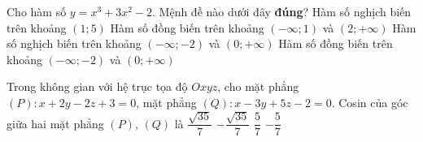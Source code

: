 \begin{ex}%
Cho hàm số $y=x^3+3x^2-2$. Mệnh đề nào dưới đây \textbf{đúng}?
\choice
{Hàm số nghịch biến trên khoảng $(1;5)$}
{Hàm số đồng biến trên khoảng $(-\infty;1)$ và $(2;+\infty)$}
{Hàm số nghịch biến trên khoảng $(-\infty;-2)$ và $(0;+\infty)$}
{\True Hàm số đồng biến trên khoảng $(-\infty;-2)$ và $(0;+\infty)$}
\end{ex}
\begin{ex}%
	Trong không gian với hệ trục tọa độ $Oxyz$, cho mặt phẳng $(P):x+2y-2z+3=0$, mặt phẳng $(Q):x-3y+5z-2=0$. Cosin của góc giữa hai mặt phẳng $(P)$, $(Q)$ là
	\choice
	{\True $\dfrac{\sqrt{35}}{7}$}
	{$-\dfrac{\sqrt{35}}{7}$}
	{$\dfrac{5}{7}$}
	{$-\dfrac{5}{7}$}
\end{ex}
